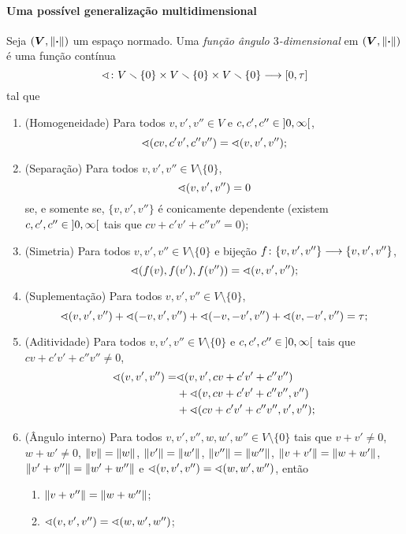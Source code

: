 \paragraph{Uma possível generalização multidimensional}


\begin{definition}
Seja $(\bm V, \left\Vert{\bm{\cdot}}\right\Vert)$ um espaço normado. Uma \emph{função ângulo $3$-dimensional} em $(\bm V, \left\Vert{\bm{\cdot}}\right\Vert)$ é uma função contínua
	\begin{equation*}
	{\sphericalangle}\colon {V \smallsetminus\{0\} \times V \smallsetminus\{0\} \times V \smallsetminus\{0\}} \longrightarrow {\left[{0},{\tau}\right]}
	\end{equation*}
tal que
	\begin{enumerate}
		\item (Homogeneidade) Para todos $v,v',v'' \in V$ e $c,c',c'' \in \left]{0},{\infty}\right[$,
			\begin{equation*}
				\sphericalangle(cv,c'v',c''v'') = \sphericalangle(v,v',v'');
			\end{equation*}
		\item (Separação) Para todos $v,v',v'' \in V \setminus \{0\}$,
			\begin{equation*}
				\sphericalangle(v,v',v'') = 0
			\end{equation*}
		se, e somente se, $\{v,v',v''\}$ é conicamente dependente (existem $c,c',c'' \in \left]{0},{\infty}\right[$ tais que $cv+c'v'+c''v''=0$);
		\item (Simetria) Para todos $v,v',v'' \in V \setminus \{0\}$ e bijeção ${f}\colon {\{v,v',v''\}} \longrightarrow {\{v,v',v''\}}$,
			\begin{equation*}
				\sphericalangle(f(v),f(v'),f(v'')) = \sphericalangle(v,v',v'');
			\end{equation*}
		\item (Suplementação) Para todos $v,v',v'' \in V \setminus \{0\}$,
			\begin{equation*}
				\sphericalangle(v,v',v'') + \sphericalangle(-v,v',v'') + \sphericalangle(-v,-v',v'') + \sphericalangle(v,-v',v'') = \tau;
			\end{equation*}
		\item (Aditividade) Para todos $v,v',v'' \in V \setminus \{0\}$ e $c,c',c'' \in \left]{0},{\infty}\right[$ tais que $cv+c'v'+c''v'' \neq 0$,
			\begin{align*}
				\sphericalangle(v,v',v'') =& \sphericalangle(v,v',cv+c'v'+c''v'') \\
					&+ \sphericalangle(v,cv+c'v'+c''v'',v'') \\
					&+ \sphericalangle(cv+c'v'+c''v'',v',v'');
			\end{align*}
		\item (Ângulo interno) Para todos $v,v',v'',w,w',w'' \in V \setminus \{0\}$ tais que $v+v' \neq 0$, $w+w' \neq 0$, $\left\Vert{v}\right\Vert=\left\Vert{w}\right\Vert$, $\left\Vert{v'}\right\Vert=\left\Vert{w'}\right\Vert$, $\left\Vert{v''}\right\Vert=\left\Vert{w''}\right\Vert$, $\left\Vert{v+v'}\right\Vert=\left\Vert{w+w'}\right\Vert$, $\left\Vert{v'+v''}\right\Vert=\left\Vert{w'+w''}\right\Vert$ e $\sphericalangle(v,v',v'')=\sphericalangle(w,w',w'')$, então
			\begin{enumerate}
				\item $\left\Vert{v+v''}\right\Vert=\left\Vert{w+w''}\right\Vert$;
				\item $\sphericalangle(v,v',v'')=\sphericalangle(w,w',w'')$;
			\end{enumerate}
	\end{enumerate}
\end{definition}
